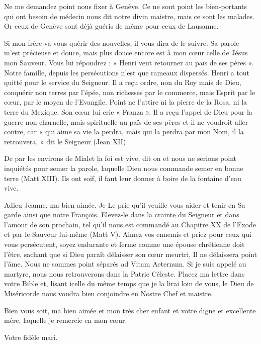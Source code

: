 

Ne me demandez point nous fixer à Genève. Ce ne sont point les bien-portants qui ont besoin de médecin nous dit notre divin maistre, mais ce sont les malades. Or ceux de Genève sont déjà guéris de même pour ceux de Lausanne.

Si mon frère va vous quérir des nouvelles, il vous dira de le suivre. Sa parole m’est précieuse et douce, mais plus douce encore est à mon cœur celle de Jésus mon Sauveur. Vous lui répondrez : « Henri veut retourner au païs de ses pères ». Notre famille, depuis les persécutions n’est que rameaux dispersés. Henri a tout quitté pour le service du Seigneur. Il a reçu ordre, non du Roy mais de Dieu, conquérir non terres par l’épée, non richesses par le commerce, mais Esprit par le cœur, par le moyen de l’Evangile. Point ne l’attire ni la pierre de la Rosa, ni la terre du Mexique. Son cœur lui crie « Franza ». Il a reçu l’appel de Dieu pour la guerre non charnelle, mais spirituelle au païs de ses pères et il ne voudroit aller contre, car « qui aime sa vie la perdra, mais qui la perdra par mon Nom, il la retrouvera, » dit le Seigneur (Jean XII).

De par les environs de Mialet la foi est vive, dit on et nous ne serions point inquiétés pour semer la parole, laquelle Dieu nous commande semer en bonne terre (Matt XIII). Ils ont soif, il faut leur donner à boire de la fontaine d’eau vive.

Adieu Jeanne, ma bien aimée. Je Le prie qu’il veuille vous aider et tenir en Sa garde ainsi que notre François. Elevez-le dans la crainte du Seigneur et dans l’amour de son prochain, tel qu’il nous est commandé au Chapitre XX de l’Exode et par le Sauveur lui-même (Matt V). Aimez vos ennemis et priez pour ceux qui vous persécutent, soyez endurante et ferme comme une épouse chrétienne doit l’être, sachant que si Dieu paraît délaisser son cœur meurtri, Il ne délaissera point l’âme. Nous ne sommes point séparés ad Vitam Aeternum. Si je suis appelé au martyre, nous nous retrouverons dans la Patrie Céleste. Placez ma lettre dans votre Bible et, lisant icelle du même temps que je la lirai loin de vous, le Dieu de Miséricorde nous voudra bien conjoindre en Nostre Chef et maistre.

Bien vous soit, ma bien aimée et mon très cher enfant et votre digne et excellente mère, laquelle je remercie en mon cœur.

\begin{center}
Votre fidèle mari.
\end{center}

